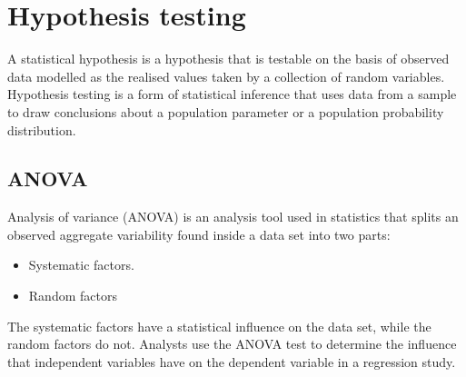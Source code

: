 \documentclass[a4paper]{article}
\begin{document}
\section{Hypothesis testing}
A statistical hypothesis is a hypothesis that is testable on the basis of observed data modelled as the realised values taken by a collection of random variables. Hypothesis testing is a form of statistical inference that uses data from a sample to draw conclusions about a population parameter or a population probability distribution.

\subsection{ANOVA}
Analysis of variance (ANOVA) is an analysis tool used in statistics that splits an observed aggregate variability found inside a data set into two parts:
\begin{itemize}
    \item Systematic factors.
    \item Random factors
\end{itemize}
The systematic factors have a statistical influence on the data set, while the random factors do not. Analysts use the ANOVA test to determine the influence that independent variables have on the dependent variable in a regression study.
\end{document}
